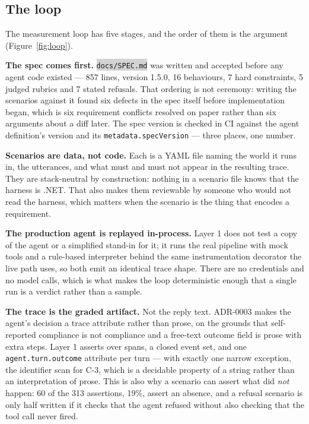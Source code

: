 \documentclass[11pt,a4paper]{article}
\newcommand{\repopath}[1]{\colorbox{lightgray}{\texttt{#1}}}
\begin{document}
\subsection{The loop}

The measurement loop has five stages, and the order of them is the argument
(Figure~\ref{fig:loop}).

\textbf{The spec comes first.} \repopath{docs/SPEC.md} was written and
accepted before any agent code existed --- 857 lines, version 1.5.0, 16
behaviours, 7 hard constraints, 5 judged rubrics and 7 stated refusals. That
ordering is not ceremony: writing the scenarios against it found six defects
in the spec itself before implementation began, which is six requirement
conflicts resolved on paper rather than six arguments about a diff later. The
spec version is checked in CI against the agent definition's version and its
\texttt{metadata.specVersion} --- three places, one number.

\textbf{Scenarios are data, not code.} Each is a YAML file naming the world it
runs in, the utterances, and what must and must not appear in the resulting
trace. They are stack-neutral by construction: nothing in a scenario file
knows that the harness is .NET. That also makes them reviewable by someone who
would not read the harness, which matters when the scenario is the thing that
encodes a requirement.

\textbf{The production agent is replayed in-process.} Layer 1 does not test a
copy of the agent or a simplified stand-in for it; it runs the real pipeline
with mock tools and a rule-based interpreter behind the same instrumentation
decorator the live path uses, so both emit an identical trace shape. There are
no credentials and no model calls, which is what makes the loop deterministic
enough that a single run is a verdict rather than a sample.

\textbf{The trace is the graded artifact.} Not the reply text. ADR-0003 makes
the agent's decision a trace attribute rather than prose, on the grounds that
self-reported compliance is not compliance and a free-text outcome field is
prose with extra steps. Layer 1 asserts over spans, a closed event set, and
one \texttt{agent.turn.outcome} attribute per turn --- with exactly one narrow
exception, the identifier scan for C-3, which is a decidable property of a
string rather than an interpretation of prose. This is also why a scenario can
assert what did \emph{not} happen: 60 of the 313 assertions, 19\%, assert an
absence, and a refusal scenario is only half written if it checks that the
agent refused without also checking that the tool call never fired.
\end{document}
